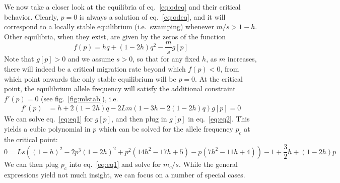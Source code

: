 \documentclass[
  11pt,
]{article}
\begin{document}
We now take a closer look at the equilibria of eq.~\ref{eq:odeq} and
their critical behavior. Clearly, \(p=0\) is always a solution of
eq.~\ref{eq:odeq}, and it will correspond to a locally stable
equilibrium (i.e.~swamping) whenever \(m/s > 1-h\). Other equilibria,
when they exist, are given by the zeros of the function \begin{equation}
  f(p) = hq + (1-2h)q^2 - \frac{m}{s}g[p] \label{eq:eq1}
\end{equation} Note that \(g[p] > 0\) and we assume \(s > 0\), so that
for any fixed \(h\), as \(m\) increases, there will indeed be a critical
migration rate beyond which \(f(p) < 0\), from which point onwards the
only stable equilibrium will be \(p=0\). At the critical point, the
equilibrium allele frequency will satisfy the additional constraint
\(f'(p) = 0\) (see fig.~\ref{fig:mlstab}), i.e. \begin{align}
  f'(p) &= h + 2(1-2h)q - 2Lm(1 - 3h - 2(1-2h)q)g[p] = 0 
  \label{eq:eq2}
  \end{align} We can solve eq.~\ref{eq:eq1} for \(g[p]\), and then plug
in \(g[p]\) in eq.~\ref{eq:eq2}. This yields a cubic polynomial in \(p\)
which can be solved for the allele frequency \(p_c\) at the critical
point: \begin{equation}
    0=Ls ((1-h)^{2}- 2p^{3} (1-2h)^2 + p^{2} (14 h^{2} - 17 h + 5) - p (7 h^{2} -
    11 h + 4)) -1 + \frac{3}{2} h + (1 - 2 h)p 
\end{equation} We can then plug \(p_c\) into eq.~\ref{eq:eq1} and solve
for \(m_c/s\). While the general expressions yield not much insight, we
can focus on a number of special cases.
\end{document}
